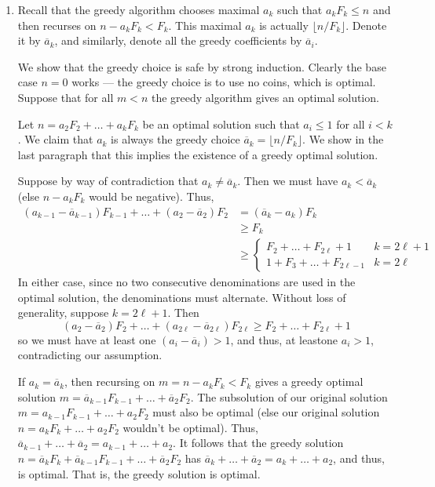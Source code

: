 \documentclass[12 pt, letterpaper]{hmcpset}
\begin{document}
\begin{solution}
\begin{enumerate}
		\item Recall that the greedy algorithm chooses maximal $a_{k}$ such that $a_{k} F_{k} \le n$ and then recurses on $n - a_{k} F_{k} < F_{k}$. This maximal $a_{k}$ is actually $\lfloor n / F_{k} \rfloor$. Denote it by $\overline{a}_{k}$, and similarly, denote all the greedy coefficients by $\overline{a}_{i}$.

			We show that the greedy choice is safe by strong induction. Clearly the base case $n = 0$ works --- the greedy choice is to use no coins, which is optimal. Suppose that for all $m < n$ the greedy algorithm gives an optimal solution.

			Let $n = a_{2} F_{2} + \dots + a_{k} F_{k}$ be an optimal solution such that $a_{i} \le 1$ for all $i < k$. We claim that $a_{k}$ is always the greedy choice $\overline{a}_{k} = \lfloor n / F_{k} \rfloor$. We show in the last paragraph that this implies the existence of a greedy optimal solution.

			Suppose by way of contradiction that $a_{k} \neq \overline{a}_{k}$. Then we must have $a_{k} < \overline{a}_{k}$ (else $n - a_{k} F_{k}$ would be negative). Thus,
			\begin{align*}
				(a_{k - 1} - \overline{a}_{k - 1}) F_{k - 1} + \dots + (a_{2} - \overline{a}_{2}) F_{2} & = (\overline{a}_{k} - a_{k}) F_{k} \\
															& \ge F_{k} \\
															& \ge \begin{cases}
																F_{2} + \dots + F_{2 \ell} + 1 & k = 2 \ell + 1 \\											1 + F_{3} + \dots + F_{2 \ell - 1} & k = 2 \ell
															\end{cases}
			\end{align*}
			In either case, since no two consecutive denominations are used in the optimal solution, the denominations must alternate. Without loss of generality, suppose $k = 2 \ell + 1$. Then
			\[
				(a_{2} - \overline{a}_{2}) F_{2} + \dots + (a_{2 \ell} - \overline{a}_{2 \ell}) F_{2 \ell} \ge F_{2} + \dots + F_{2 \ell} + 1
			\]
			so we must have at least one $(a_{i} - \overline{a}_{i}) > 1$, and thus, at leastone  $a_{i} > 1$, contradicting our assumption.

			If $a_{k} = \overline{a}_{k}$, then recursing on  $m = n - a_{k} F_{k} < F_{k}$ gives a greedy optimal solution $m = \overline{a}_{k - 1} F_{k - 1} + \dots + \overline{a}_{2} F_{2}$. The subsolution of our original solution $m = a_{k - 1} F_{k - 1} + \dots + a_{2} F_{2}$ must also be optimal (else our original solution $n = a_{k} F_{k} + \dots + a_{2} F_{2}$ wouldn't be optimal). Thus, $\overline{a}_{k - 1} + \dots + \overline{a}_{2} = a_{k - 1} + \dots + a_{2}$. It follows that the greedy solution $n = \overline{a}_{k} F_{k} + \overline{a}_{k - 1} F_{k - 1} + \dots + \overline{a}_{2} F_{2}$ has $\overline{a}_{k} + \dots + \overline{a}_{2} = a_{k} + \dots + a_{2}$, and thus, is optimal. That is, the greedy solution is optimal.
	\end{enumerate}
\end{solution}
\end{document}
